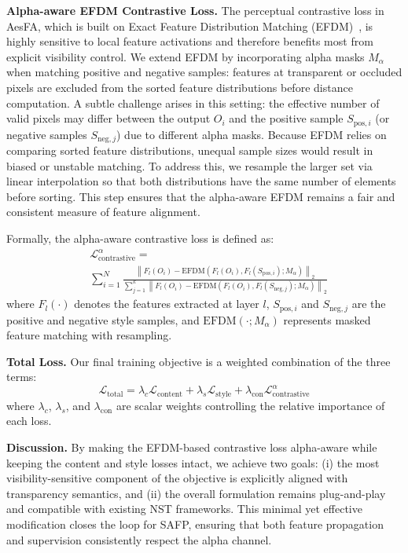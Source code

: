 \documentclass[letterpaper]{article} %
\begin{document}
\noindent\textbf{Alpha-aware EFDM Contrastive Loss.}
The perceptual contrastive loss in AesFA, which is built on Exact Feature Distribution Matching (EFDM)~\cite{zhang2022exact}, is highly sensitive to local feature activations and therefore benefits most from explicit visibility control. We extend EFDM by incorporating alpha masks $M_\alpha$ when matching positive and negative samples: features at transparent or occluded pixels are excluded from the sorted feature distributions before distance computation. 
A subtle challenge arises in this setting: the effective number of valid pixels may differ between the output $O_i$ and the positive sample $S_{\text{pos},i}$ (or negative samples $S_{\text{neg},j}$) due to different alpha masks. Because EFDM relies on comparing sorted feature distributions, unequal sample sizes would result in biased or unstable matching. To address this, we resample the larger set via linear interpolation so that both distributions have the same number of elements before sorting. This step ensures that the alpha-aware EFDM remains a fair and consistent measure of feature alignment.

Formally, the alpha-aware contrastive loss is defined as:
\begin{equation}
    \begin{aligned}
    &\mathcal{L}_{\text{contrastive}}^{\alpha} =\\
    &\sum_{i=1}^N
    \frac{
    \left\|
    F_l(O_i) -
    \text{EFDM}\left(F_l(O_i), F_l(S_{\text{pos}, i}); M_\alpha \right)
    \right\|_2
    }{
    \sum_{j=1}^k
    \left\|
    F_l(O_i) -
    \text{EFDM}\left(F_l(O_i), F_l(S_{\text{neg}, j}); M_\alpha \right)
    \right\|_2
    }
    \label{eq:alpha_efdm}
    \end{aligned}
\end{equation}
where $F_l(\cdot)$ denotes the features extracted at layer $l$, $S_{\text{pos}, i}$ and $S_{\text{neg}, j}$ are the positive and negative style samples, and $\text{EFDM}(\cdot; M_\alpha)$ represents masked feature matching with resampling.

\noindent\textbf{Total Loss.}
Our final training objective is a weighted combination of the three terms:
\begin{equation}
\mathcal{L}_{\text{total}} =
\lambda_c \mathcal{L}_{\text{content}} +
\lambda_s \mathcal{L}_{\text{style}} +
\lambda_{\text{con}} \mathcal{L}_{\text{contrastive}}^{\alpha}
\end{equation}
where $\lambda_c$, $\lambda_s$, and $\lambda_{\text{con}}$ are scalar weights controlling the relative importance of each loss.

\noindent\textbf{Discussion.}
By making the EFDM-based contrastive loss alpha-aware while keeping the content and style losses intact, we achieve two goals: (i) the most visibility-sensitive component of the objective is explicitly aligned with transparency semantics, and (ii) the overall formulation remains plug-and-play and compatible with existing NST frameworks. This minimal yet effective modification closes the loop for SAFP, ensuring that both feature propagation and supervision consistently respect the alpha channel.




\end{document}
